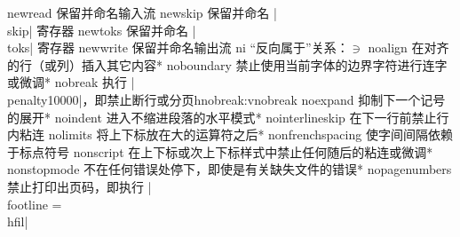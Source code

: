 \capcs newread {保留并命名输入流}{}{\@newread}
\capcs newskip {保留并命名 |\\skip| 寄存器}{}{\@newskip}
\capcs newtoks {保留并命名 |\\toks| 寄存器}{}{\@newtoks}
\capcs newwrite {保留并命名输出流}{}{\@newwrite}
\capcs ni {“反向属于”关系：$\ni$}{}{}
\capcs noalign {在对齐的行（或列）插入其它内容}*{}
\capcs noboundary {禁止使用当前字体的边界字符进行连字或微调}*{}
\capcstwo nobreak {执行 |\\penalty10000|，即禁止断行或分页}{}{hnobreak:vnobreak}
\capcs noexpand {抑制下一个记号的展开}*{}
\capcs noindent {进入不缩进段落的水平模式}*{}
\capcs nointerlineskip {在下一行前禁止行内粘连}{}{}
\capcs nolimits {将上下标放在大的运算符之后}*{}
\capcs nonfrenchspacing {使字间间隔依赖于标点符号}{}{}
\capcs nonscript {在上下标或次上下标样式中禁止任何随后的粘连或微调}*{}
\capcs nonstopmode {不在任何错误处停下，即使是有关缺失文件的错误}*{}
\capcs nopagenumbers {禁止打印出页码，即执行 |\\footline = {\\hfil}|}{}{}
